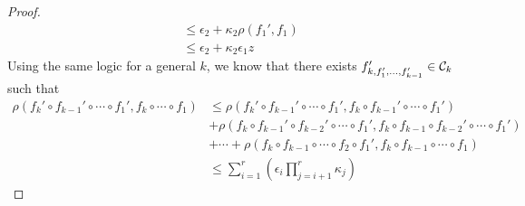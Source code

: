 \begin{proof}
\begin{align}
   &\leq \epsilon_2 + \kappa_2 \rho\left(f_1', f_1\right) \\ 
   &\leq \epsilon_2 + \kappa_2\epsilon_1z
\end{align}
Using the same logic for a general $k$, we know that there exists $f_{k,f_1',\dots,f_{k-1}'}' \in \mathcal C_k$ such that
\begin{align}
    \rho\left(f_k' \circ f_{k-1}' \circ \cdots \circ f_1', f_k \circ \cdots \circ f_1\right) &\leq \rho\left(f_k' \circ f_{k-1}'\circ \cdots \circ f_1', f_k \circ f_{k-1}'\circ \cdots \circ f_1' \right) \\ 
    &+ \rho\left(f_k \circ f_{k-1}'\circ f_{k-2}' \circ \cdots \circ f_1', f_k \circ f_{k-1}\circ f_{k-2}' \circ \cdots \circ f_1'\right) \\ &+ \cdots + \rho\left(f_k \circ f_{k-1}\circ \cdots \circ f_2 \circ f_1', f_k \circ f_{k-1}\circ \cdots \circ f_1\right) \\ & \leq \sum_{i=1}^{r} \left(\epsilon_i\prod_{j=i+1}^{r}\kappa_{j}\right)
\end{align}
\end{proof}

